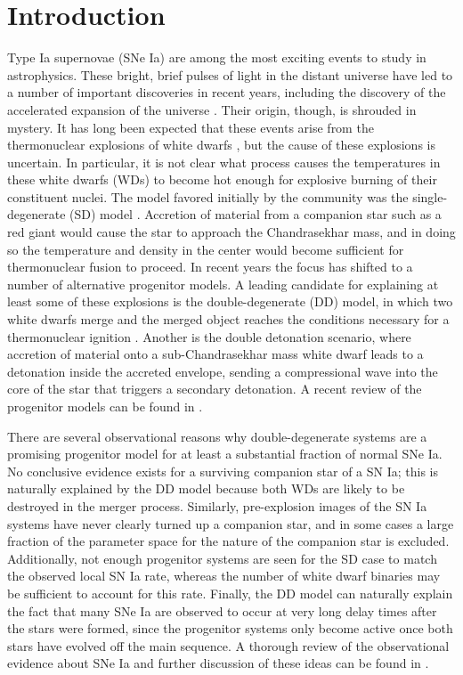 \documentclass[12pt]{article}
\begin{document}
\newpage
{}
\section{Introduction}
\label{sec:introduction}

Type Ia supernovae (SNe Ia) are among the most exciting
events to study in astrophysics. These bright, brief pulses of light
in the distant universe have led to a number of important discoveries
in recent years, including the discovery of the accelerated expansion
of the universe \citep{perlmutter1999,riess1998}. Their origin, though,
is shrouded in mystery. It has long been expected that these
events arise from the thermonuclear explosions of white dwarfs
\citep{hoyle-fowler:1960}, but the cause of these explosions is
uncertain. In particular, it is not clear what process causes the
temperatures in these white dwarfs (WDs) to become hot enough for explosive
burning of their constituent nuclei. The model favored initially by the
community was the single-degenerate (SD) model
\citep{whelan-iben:1973}. Accretion of material from a companion star
such as a red giant would cause the star to approach the Chandrasekhar
mass, and in doing so the temperature and density in the center would
become sufficient for thermonuclear fusion to proceed. In
recent years the focus has shifted to a number of alternative progenitor models. A
leading candidate for explaining at least some of these explosions is
the double-degenerate (DD) model, in which two white dwarfs merge and
the merged object reaches the conditions necessary for a thermonuclear
ignition \citep{ibentutukov:1984,webbink:1984}. Another is the double
detonation scenario, where accretion of material onto a
sub-Chandrasekhar mass white dwarf leads to a detonation inside the
accreted envelope, sending a compressional wave into the
core of the star that triggers a secondary detonation. A recent
review of the progenitor models can be found in
\citet{hillebrandt:2013}.

There are several observational reasons why double-degenerate systems
are a promising progenitor model for at least a substantial fraction
of normal SNe Ia. No conclusive evidence exists for a surviving
companion star of a SN Ia; this is naturally explained by the DD model
because both WDs are likely to be destroyed in the merger
process. Similarly, pre-explosion images of the SN Ia systems have
never clearly turned up a companion star, and in some cases a large
fraction of the parameter space for the nature of the companion star
is excluded. Additionally, not enough progenitor systems are seen for
the SD case to match the observed local SN Ia rate, whereas the number
of white dwarf binaries may be sufficient to account for this
rate. Finally, the DD model can naturally explain the fact that many
SNe Ia are observed to occur at very long delay times after the stars
were formed, since the progenitor systems only become active once both
stars have evolved off the main sequence. A thorough review of the
observational evidence about SNe Ia and further discussion of these
ideas can be found in \cite{maoz:2014}.
\end{document}

